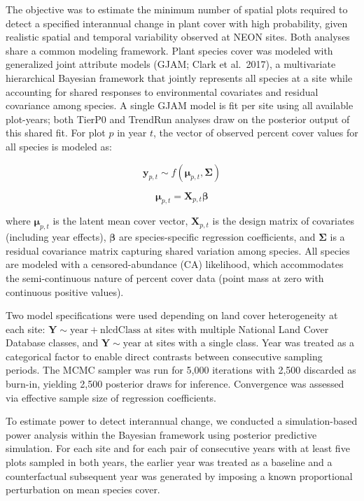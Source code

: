 \documentclass[
  11pt,
]{article}
\begin{document}
The objective was to estimate the minimum number of spatial plots
required to detect a specified interannual change in plant cover with
high probability, given realistic spatial and temporal variability
observed at NEON sites. Both analyses share a common modeling framework.
Plant species cover was modeled with generalized joint attribute models
(GJAM; Clark et al.~2017), a multivariate hierarchical Bayesian
framework that jointly represents all species at a site while accounting
for shared responses to environmental covariates and residual covariance
among species. A single GJAM model is fit per site using all available
plot-years; both TierP0 and TrendRun analyses draw on the posterior
output of this shared fit. For plot \(p\) in year \(t\), the vector of
observed percent cover values for all species is modeled as:

\[
\mathbf{y}_{p,t} \sim f(\boldsymbol{\mu}_{p,t}, \boldsymbol{\Sigma})
\]

\[
\boldsymbol{\mu}_{p,t} = \mathbf{X}_{p,t}\boldsymbol{\beta}
\]

where \(\boldsymbol{\mu}_{p,t}\) is the latent mean cover vector,
\(\mathbf{X}_{p,t}\) is the design matrix of covariates (including year
effects), \(\boldsymbol{\beta}\) are species-specific regression
coefficients, and \(\boldsymbol{\Sigma}\) is a residual covariance
matrix capturing shared variation among species. All species are modeled
with a censored-abundance (CA) likelihood, which accommodates the
semi-continuous nature of percent cover data (point mass at zero with
continuous positive values).

Two model specifications were used depending on land cover heterogeneity
at each site: \(\mathbf{Y} \sim \text{year} + \text{nlcdClass}\) at
sites with multiple National Land Cover Database classes, and
\(\mathbf{Y} \sim \text{year}\) at sites with a single class. Year was
treated as a categorical factor to enable direct contrasts between
consecutive sampling periods. The MCMC sampler was run for 5,000
iterations with 2,500 discarded as burn-in, yielding 2,500 posterior
draws for inference. Convergence was assessed via effective sample size
of regression coefficients.

To estimate power to detect interannual change, we conducted a
simulation-based power analysis within the Bayesian framework using
posterior predictive simulation. For each site and for each pair of
consecutive years with at least five plots sampled in both years, the
earlier year was treated as a baseline and a counterfactual subsequent
year was generated by imposing a known proportional perturbation on mean
species cover.
\end{document}
